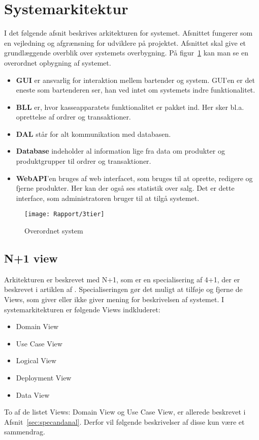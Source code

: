 \newpage
\section{Systemarkitektur}
I det følgende afsnit beskrives arkitekturen for systemet. Afsnittet fungerer som en vejledning og afgrænsning for udviklere på projektet. Afsnittet skal give et grundlæggende overblik over systemets overbygning. På figur~\ref{fig:ArkiDia} kan man se en overordnet opbygning af systemet.
	
\begin{itemize}
	\item \textbf{\gls{GUI}} er ansvarlig for interaktion mellem \Gls{bartender} og \Gls{system}. \gls{GUI}'en er det eneste som \Gls{bartender}en ser, han ved intet om \gls{system}ets indre funktionalitet.
	\item \textbf{\gls{BLL}} er, hvor kasseapparatets funktionalitet er pakket ind. Her sker bl.a. oprettelse af ordrer og transaktioner.
	\item \textbf{\gls{DAL}} står for alt kommunikation med databasen.
	\item \textbf{Database} indeholder al information lige fra data om produkter og produktgrupper til ordrer og transaktioner.
	\item \textbf{\gls{WebAPI}}'en bruges af web interfacet, som bruges til at oprette, redigere og fjerne produkter. Her kan der også ses statistik over salg. Det er dette interface, som \Gls{administrator}en bruger til at tilgå \gls{system}et.
\end{itemize}

\begin{figure}[H]
	\centering
	\texttt{[image: Rapport/3tier]}
	\caption{Overordnet system}
	\label{fig:ArkiDia}
\end{figure}

\subsection{N+1 view}
Arkitekturen er beskrevet med N+1, som er en specialisering af 4+1, der er beskrevet i artiklen af \cite{4plus1}. Specialiseringen gør det muligt at tilføje og fjerne de Views, som giver eller ikke giver mening for beskrivelsen af \gls{system}et. I systemarkitekturen er følgende Views indkluderet:
\begin{itemize}
	\item Domain View
	\item Use Case View
	\item Logical View
	\item Deployment View
	\item Data View
\end{itemize}
To af de listet Views: Domain View og Use Case View, er allerede beskrevet i Afsnit~\ref{sec:specandanal}. Derfor vil følgende beskrivelser af disse kun være et sammendrag.

